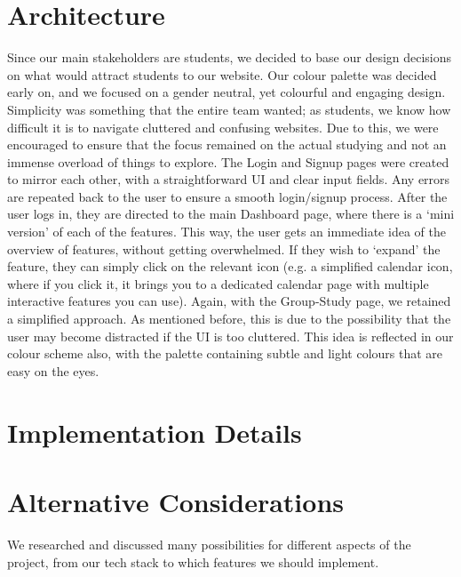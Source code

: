 \section{Architecture}
\label{sect:architecture}

Since our main stakeholders are students, we decided to base our design decisions on what would attract students to our website. Our colour palette was decided early on, and we focused on a gender neutral, yet colourful and engaging design. Simplicity was something that the entire team wanted; as students, we know how difficult it is to navigate cluttered and confusing websites. Due to this, we were encouraged to ensure that the focus remained on the actual studying and not an immense overload of things to explore. The Login and Signup pages were created to mirror each other, with a straightforward UI and clear input fields. Any errors are repeated back to the user to ensure a smooth login/signup process. After the user logs in, they are directed to the main Dashboard page, where there is a ‘mini version’ of each of the features. This way, the user gets an immediate idea of the overview of features, without getting overwhelmed. If they wish to ‘expand’ the feature, they can simply click on the relevant icon (e.g. a simplified calendar icon, where if you click it, it brings you to a dedicated calendar page with multiple interactive features you can use). Again, with the Group-Study page, we retained a simplified approach. As mentioned before, this is due to the possibility that the user may become distracted if the UI is too cluttered. This idea is reflected in our colour scheme also, with the palette containing subtle and light colours that are easy on the eyes.

\section{Implementation Details}
\label{sect:implementation-details}

\section{Alternative Considerations}
\label{sect:alternative-considerations}
We researched and discussed many possibilities for different aspects of the project, from our tech stack to which features we should implement.

